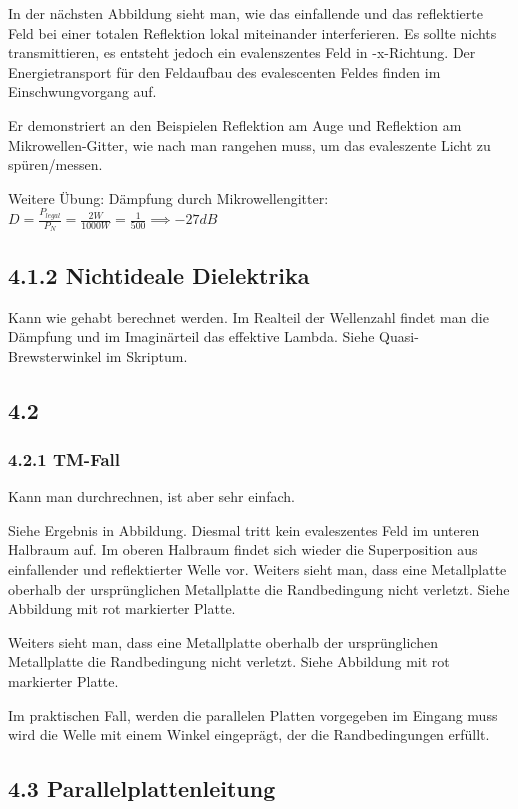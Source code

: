 \documentclass[a4paper]{article}
\begin{document}
In der nächsten Abbildung sieht man, wie das einfallende und das reflektierte Feld bei einer totalen Reflektion  lokal miteinander interferieren. Es sollte nichts transmittieren, es entsteht jedoch ein evalenszentes Feld in -x-Richtung. Der Energietransport für den Feldaufbau des evalescenten Feldes finden im Einschwungvorgang auf.

Er demonstriert an den Beispielen Reflektion am Auge und Reflektion am Mikrowellen-Gitter, wie nach man rangehen muss, um das evaleszente Licht zu spüren/messen.

Weitere Übung: Dämpfung durch Mikrowellengitter: $D=\frac{P_{legal}}{P_{N}}=\frac{2W}{1000W}=\frac{1}{500}\implies -27dB$

\subsection*{4.1.2 Nichtideale Dielektrika}
Kann wie gehabt berechnet werden. Im Realteil der Wellenzahl findet man die Dämpfung und im Imaginärteil das effektive Lambda.
Siehe Quasi-Brewsterwinkel im Skriptum.

\subsection*{4.2}
\subsubsection*{4.2.1 TM-Fall}
Kann man durchrechnen, ist aber sehr einfach.

Siehe Ergebnis in Abbildung. Diesmal tritt kein evaleszentes Feld im unteren Halbraum auf. Im oberen Halbraum findet sich wieder die Superposition aus einfallender und reflektierter Welle vor.
Weiters sieht man, dass eine Metallplatte oberhalb der ursprünglichen Metallplatte die Randbedingung nicht verletzt. Siehe Abbildung mit rot markierter Platte.

Weiters sieht man, dass eine Metallplatte oberhalb der ursprünglichen Metallplatte die Randbedingung nicht verletzt. Siehe Abbildung mit rot markierter Platte.

Im praktischen Fall, werden die parallelen Platten vorgegeben im Eingang muss wird die Welle mit einem Winkel eingeprägt, der die Randbedingungen erfüllt.

\subsection*{4.3 Parallelplattenleitung}
\end{document}
